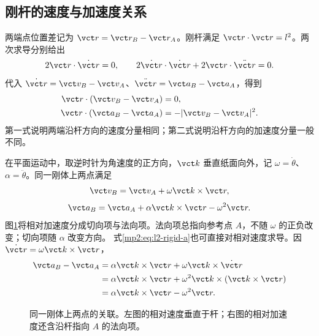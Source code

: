 \documentclass[11pt,openany,fontset=fandol]{ctexbook}
\theoremstyle{definition}\newtheorem{example}{例}[chapter]\newtheorem{exercise}{习题}[chapter]
\begin{document}
\subsection{刚杆的速度与加速度关系}
两端点位置差记为 $\vct r=\vct r_B-\vct r_A$。刚杆满足 $\vct r\cdot\vct r=l^2$。两次求导分别给出
\[
2\vct r\cdot\dot{\vct r}=0,\qquad
2\dot{\vct r}\cdot\dot{\vct r}+2\vct r\cdot\ddot{\vct r}=0.
\]
代入 $\dot{\vct r}=\vct v_B-\vct v_A$、$\ddot{\vct r}=\vct a_B-\vct a_A$，得到
\begin{align*}
\vct r\cdot(\vct v_B-\vct v_A)&=0,\\
\vct r\cdot(\vct a_B-\vct a_A)&=-|\vct v_B-\vct v_A|^2.
\end{align*}
第一式说明两端沿杆方向的速度分量相同；第二式说明沿杆方向的加速度分量一般不同。

在平面运动中，取逆时针为角速度的正方向，$\vct k$ 垂直纸面向外，记 $\omega=\dot\theta$、$\alpha=\ddot\theta$。同一刚体上两点满足
\begin{equation}\label{mp2:eq:l2-rigid-v}
\vct v_B=\vct v_A+\omega\vct k\times\vct r,
\end{equation}
\begin{equation}\label{mp2:eq:l2-rigid-a}
\vct a_B=\vct a_A+\alpha\vct k\times\vct r-\omega^2\vct r.
\end{equation}
图\ref{mp2:fig:l2rigid}将相对加速度分成切向项与法向项。法向项总指向参考点 $A$，不随 $\omega$ 的正负改变；切向项随 $\alpha$ 改变方向。
式\eqref{mp2:eq:l2-rigid-a}也可直接对相对速度求导。因 $\dot{\vct r}=\omega\vct k\times\vct r$，
\[
\begin{aligned}
\vct a_B-\vct a_A
&=\alpha\vct k\times\vct r+\omega\vct k\times\dot{\vct r}\\
&=\alpha\vct k\times\vct r+\omega^2\vct k\times(\vct k\times\vct r)\\
&=\alpha\vct k\times\vct r-\omega^2\vct r.
\end{aligned}
\]

\begin{figure}[H]\centering
{}
\caption{同一刚体上两点的关联。左图的相对速度垂直于杆；右图的相对加速度还含沿杆指向 $A$ 的法向项。}\label{mp2:fig:l2rigid}
\end{figure}
\end{document}
